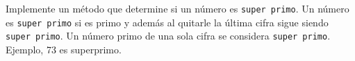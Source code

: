 Implemente un método que determine si un número es \texttt{super primo}. Un número es \texttt{super primo} si es primo y además al quitarle la última cifra sigue siendo \texttt{super primo}. Un número primo de una sola cifra se considera \texttt{super primo}. Ejemplo, 73 es superprimo.
